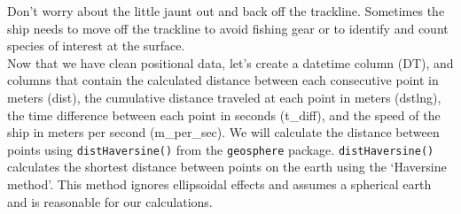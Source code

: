 \documentclass[]{article}
\newenvironment{Shaded}{\begin{snugshade}}{\end{snugshade}}
\newcommand{\DataTypeTok}[1]{\textcolor[rgb]{0.13,0.29,0.53}{#1}}
\newcommand{\DecValTok}[1]{\textcolor[rgb]{0.00,0.00,0.81}{#1}}
\newcommand{\KeywordTok}[1]{\textcolor[rgb]{0.13,0.29,0.53}{\textbf{#1}}}
\newcommand{\NormalTok}[1]{#1}
\newcommand{\OperatorTok}[1]{\textcolor[rgb]{0.81,0.36,0.00}{\textbf{#1}}}
\newcommand{\OtherTok}[1]{\textcolor[rgb]{0.56,0.35,0.01}{#1}}
\newcommand{\StringTok}[1]{\textcolor[rgb]{0.31,0.60,0.02}{#1}}
\begin{document}
Don't worry about the little jaunt out and back off the trackline.
Sometimes the ship needs to move off the trackline to avoid fishing gear
or to identify and count species of interest at the surface.\\
 Now that we have clean positional data, let's create a datetime column
(DT), and columns that contain the calculated distance between each
consecutive point in meters (dist), the cumulative distance traveled at
each point in meters (dstlng), the time difference between each point in
seconds (t\_diff), and the speed of the ship in meters per second
(m\_per\_sec). We will calculate the distance between points using
\texttt{distHaversine()} from the \texttt{geosphere} package.
\texttt{distHaversine()} calculates the shortest distance between points
on the earth using the `Haversine method'. This method ignores
ellipsoidal effects and assumes a spherical earth and is reasonable for
our calculations.

\begin{Shaded}
\end{Shaded}
\end{document}
